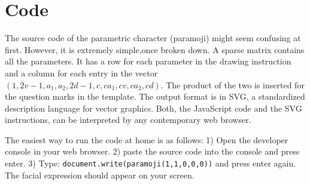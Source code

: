 \documentclass[conference]{IEEEtran}
\begin{document}
\section*{Code}
The source code of the parametric character (paramoji) might seem confusing at first.
However, it is extremely simple,once broken down.
A sparse matrix contains all the parameters. It has a row for each parameter in the drawing instruction and a column
for each entry in the vector $(1, 2v-1, a_1, a_2, 2d-1, c, ca_1,cv, ca_2, cd)$.  The product of the two is inserted
for the question marks in the template. The output format is in SVG, a standardized description language for
vector graphics. Both, the JavaScript code and the SVG instructions, can be interpreted by any contemporary
web browser.

The easiest way to run the code at home is as follows: 1) Open the developer console in your web browser.
2) paste the source code into the console and press enter. 3) Type: \texttt{document.write(paramoji(1,1,0,0,0))}
and press enter again. The facial expression should appear on your screen.
\end{document}
